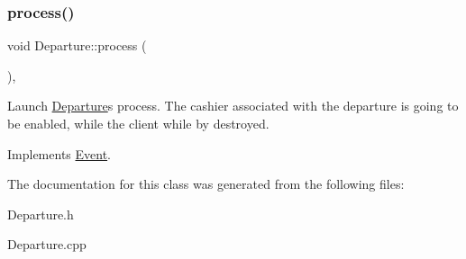\subsubsection{\texorpdfstring{process()}{process()}}
{\footnotesize\ttfamily void Departure\+::process (\begin{DoxyParamCaption}{ }\end{DoxyParamCaption})\hspace{0.3cm}{\ttfamily [override]}, {\ttfamily [virtual]}}

Launch \hyperlink{classDeparture}{Departure}\textquotesingle{}s process. The cashier associated with the departure is going to be enabled, while the client while by destroyed. 

Implements \hyperlink{classEvent_af1940e82c4da67c8119f0dfe026949b4}{Event}.



The documentation for this class was generated from the following files\+:\begin{DoxyCompactItemize}
\item 
Departure.\+h\item 
Departure.\+cpp\end{DoxyCompactItemize}
